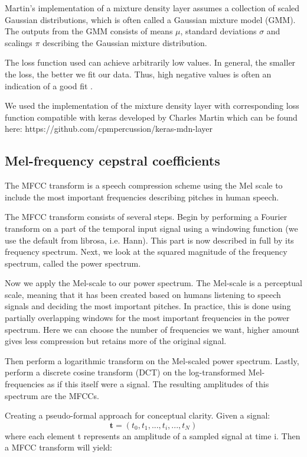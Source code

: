 \documentclass[conference]{IEEEtran}
\begin{document}
Martin's implementation of a mixture density layer assumes a collection of scaled Gaussian distributions, which is often called a Gaussian mixture model (GMM). The outputs from the GMM consists of means \boldmath$\mu$, standard deviations $\sigma$ and scalings $\pi$ describing the Gaussian mixture distribution. \unboldmath

The loss function used can achieve arbitrarily low values. In general, the smaller the loss, the better we fit our data. Thus, high negative values is often an indication of a good fit \cite{b5}.

We used the implementation of the mixture density layer with corresponding loss function compatible with keras developed by Charles Martin which can be found here:
https://github.com/cpmpercussion/keras-mdn-layer

\subsection{Mel-frequency cepstral coefficients}
The MFCC transform is a speech compression scheme using the Mel scale to include the most important frequencies describing pitches in human speech.

The MFCC transform consists of several steps. Begin by performing a Fourier transform on a part of the temporal input signal using a windowing function (we use the default from librosa, i.e. Hann). This part is now described in full by its frequency spectrum. Next, we look at the squared magnitude of the frequency spectrum, called the power spectrum. 

Now we apply the Mel-scale to our power spectrum. The Mel-scale is a perceptual scale, meaning that it has been created based on humans listening to speech signals and deciding the most important pitches. In practice, this is done using partially overlapping windows for the most important frequencies in the power spectrum. Here we can choose the number of frequencies we want, higher amount gives less compression but retains more of the original signal.

Then perform a logarithmic transform on the Mel-scaled power spectrum. Lastly, perform a discrete cosine transform (DCT) on the log-transformed Mel-frequencies as if this itself were a signal. The resulting amplitudes of this spectrum are the MFCCs. \cite{b14, b15}

Creating a pseudo-formal approach for conceptual clarity. Given a signal:
\[\textbf{t} = (t_0, t_1, ..., t_i, ...,  t_N) \]
where each element t represents an amplitude of a sampled signal at time i. Then a MFCC transform will yield:
\end{document}
